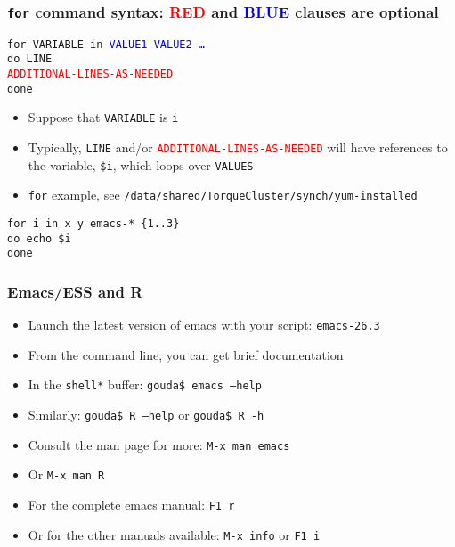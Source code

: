 \documentclass[11pt,pdftex,dvipsnames,usenames,helvetica]{beamer}
\begin{document}
\begin{frame}
\frametitle{{\tt for} command syntax: \textcolor{red}{RED} and 
\textcolor{blue}{BLUE} clauses are optional}

{\tt for VARIABLE in \textcolor{blue}{VALUE1 VALUE2 \dots}\\
do LINE\\
\textcolor{red}{ADDITIONAL-LINES-AS-NEEDED}\\
done}

\begin{itemize}
\item Suppose that {\tt VARIABLE} is {\tt i}
\item Typically, {\tt LINE} and/or 
{\tt \textcolor{red}{ADDITIONAL-LINES-AS-NEEDED}} will have references 
to the variable, {\tt \$i}, which loops over {\tt VALUES}
\item {\tt for} example, see 
{\tt /data/shared/TorqueCluster/synch/yum-installed}
\end{itemize}

{\tt for i in x y emacs-* \{1..3\}\\
do echo \$i\\
done}

\end{frame}

\begin{frame}
\frametitle{Emacs/ESS and R}
\begin{itemize}
\item Launch the latest version of emacs with your script: {\tt emacs-26.3}
\item From the command line, you can get brief documentation
\item In the {\tt *shell*} buffer: {\tt gouda\$ emacs --help}
\item Similarly: {\tt gouda\$ R --help} or  {\tt gouda\$ R -h}
\item Consult the man page for more: {\tt M-x man emacs}
\item Or {\tt M-x man R}
\item For the complete emacs manual: {\tt F1 r}
\item Or for the other manuals available: {\tt M-x info} or {\tt F1 i}
\end{itemize}
\end{frame}
\end{document}
